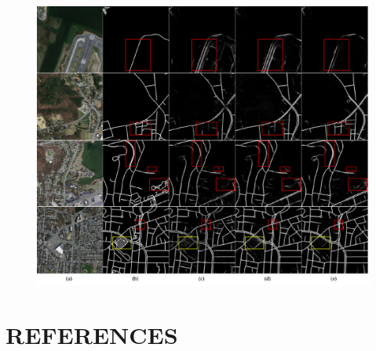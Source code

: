 \documentclass{article}
\begin{document}
\begin{figure}[t]
\begin{center}
\includegraphics[width=180mm]{fig6.eps}
\caption{}
\end{center}
\end{figure}
\vfill\pagebreak

\section{REFERENCES}
\label{sec:refs}
\end{document}
